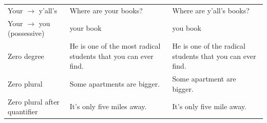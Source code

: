 \begin{longtable}{
  >{\raggedright\arraybackslash}p{3.2cm}
  >{\raggedright\arraybackslash}p{4.8cm}
  >{\raggedright\arraybackslash}p{4.8cm}
}
Your $\rightarrow$ y'all's & Where are your books? & Where are y'all's books? \\
Your $\rightarrow$ you (possessive) & your book & you book \\
Zero degree & He is one of the most radical students that you can ever find. & He is one of the radical students that you can ever find. \\
Zero plural & Some apartments are bigger. & Some apartment are bigger. \\
Zero plural after quantifier & It's only five miles away. & It's only five mile away. \\

\end{longtable}
\setlength{\tabcolsep}{6pt}  %